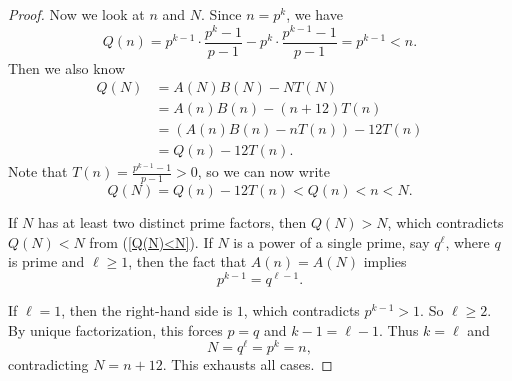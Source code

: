 \documentclass[12pt, twoside]{amsart}
\newtheorem{lemma}[theorem]{Lemma}
\theoremstyle{definition}
\begin{document}
\begin{proof}
    Now we look at $n$ and $N$. Since $n=p^k$, we have 
    \[Q(n)=p^{k-1}\cdot\frac{p^k-1}{p-1}-p^k\cdot\frac{p^{k-1}-1}{p-1}=p^{k-1}<n.\]
    Then we also know 
    \begin{align*}
        Q(N)&=A(N)B(N)-NT(N)\\
        &=A(n)B(n)-(n+12)T(n)\\
        &=\left(A(n)B(n)-nT(n)\right)-12T(n)\\
        &=Q(n)-12T(n).
    \end{align*}
    Note that $T(n)=\frac{p^{k-1}-1}{p-1}>0$, so we can now write
    \begin{equation}\label{Q(N)<N}
        Q(N)=Q(n)-12T(n)<Q(n)<n<N.
    \end{equation}
    
    If $N$ has at least two distinct prime factors, then $Q(N)>N$, which contradicts $Q(N)<N$ from (\ref{Q(N)<N}). If $N$ is a power of a single prime, say $q^\ell$, where $q$ is prime and $\ell\ge1$, then the fact that $A(n)=A(N)$ implies
    \[p^{k-1}=q^{\ell-1}.\]

    If $\ell=1$, then the right-hand side is $1$, which contradicts $p^{k-1}>1$. So $\ell\ge2$. By unique factorization, this forces $p=q$ and $k-1=\ell-1$. Thus $k=\ell$ and
    \[N=q^\ell=p^k=n,\]
    contradicting $N=n+12$. This exhausts all cases.
\end{proof}



\end{document}
